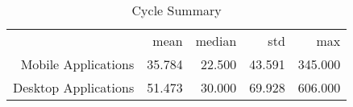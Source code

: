 \begin{table}[ht]
\centering
\caption{Cycle Summary} 
\begin{tabular}{rrrrr}
  & mean & median & std & max \\ 
 Mobile Applications & 35.784 & 22.500 & 43.591 & 345.000 \\ 
   \hline
Desktop Applications & 51.473 & 30.000 & 69.928 & 606.000 \\ 
  \end{tabular}
\end{table}
